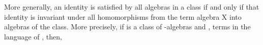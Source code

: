 \begin{code}
\AgdaSpace{}%
\AgdaSpace{}%
\AgdaSpace{}%
\AgdaSymbol{)}%
\>[49]\AgdaSpace{}%
\AgdaSymbol{(}\AgdaSpace{}%
\AgdaSpace{}%
\AgdaSpace{}%
\AgdaSpace{}%
\AgdaSpace{}%
\AgdaSymbol{)}\AgdaSpace{}%
\<%
\\
%
\>[28]\AgdaSpace{}%
\AgdaSpace{}%
\AgdaSpace{}%
\AgdaSymbol{((}\AgdaSpace{}%
\AgdaSpace{}%
\AgdaSpace{}%
\AgdaSymbol{)}\AgdaSpace{}%
\AgdaSymbol{)}%
\>[49]\AgdaSymbol{(}\AgdaSpace{}%
\AgdaSpace{}%
\AgdaSpace{}%
\AgdaSpace{}%
\AgdaSymbol{(}\AgdaSpace{}%
\AgdaSymbol{\{}\AgdaSpace{}%
\AgdaSymbol{=}\AgdaSpace{}%
\AgdaSymbol{\}}\AgdaSpace{}%
\AgdaSymbol{))}\AgdaSpace{}%
\<%
\\
%
\>[28]\AgdaSpace{}%
\AgdaSpace{}%
\AgdaSpace{}%
%
\>[48]\<%
\end{code}
\ccpad
More generally, an identity is satisfied by all algebras in a class if and only if that identity is invariant under all homomorphisms from the term algebra  \ab X into algebras of the class. More precisely, if  is a class of -algebras and ,  terms in the language of , then,\\

